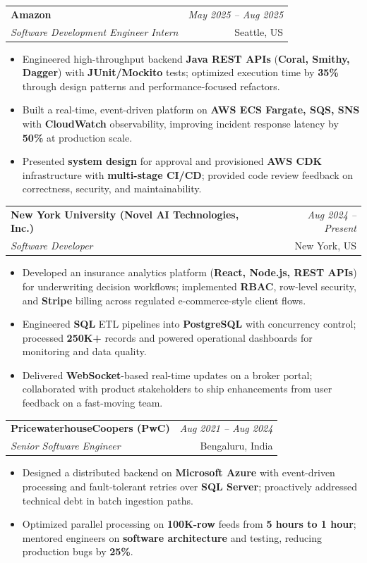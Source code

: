 \documentclass[a4paper,10pt]{article}
\makeatletter
\newcommand{\resumeSubheading}[4]{
\vspace{0.3mm}\item
    \begin{tabular*}{0.98\textwidth}[t]{l@{\extracolsep{\fill}}r}
        \textbf{#1} & \textit{\footnotesize{#4}} \\
        \textit{\footnotesize{#3}} & \footnotesize{#2}\\
    \end{tabular*}\vspace{-2mm}
}
\newcommand{\resumeItemListStart}{\begin{itemize}[leftmargin=*, labelsep=1mm, itemsep=0pt]}
\newcommand{\resumeItemListEnd}{\end{itemize}\vspace{-2mm}}
\makeatother
\begin{document}
\resumeSubheading
{Amazon}{Seattle, US}
{Software Development Engineer Intern}{May 2025 -- Aug 2025}
\resumeItemListStart
\item \footnotesize{Engineered high-throughput backend \textbf{Java REST APIs} (\textbf{Coral, Smithy, Dagger}) with \textbf{JUnit/Mockito} tests; optimized execution time by \textbf{35\%} through design patterns and performance-focused refactors.}
\item \footnotesize{Built a real-time, event-driven platform on \textbf{AWS ECS Fargate, SQS, SNS} with \textbf{CloudWatch} observability, improving incident response latency by \textbf{50\%} at production scale.}
\item \footnotesize{Presented \textbf{system design} for approval and provisioned \textbf{AWS CDK} infrastructure with \textbf{multi-stage CI/CD}; provided code review feedback on correctness, security, and maintainability.}
\resumeItemListEnd

\resumeSubheading
{New York University (Novel AI Technologies, Inc.)}{New York, US}
{Software Developer}{Aug 2024 -- Present}
\resumeItemListStart
\item \footnotesize{Developed an insurance analytics platform (\textbf{React, Node.js, REST APIs}) for underwriting decision workflows; implemented \textbf{RBAC}, row-level security, and \textbf{Stripe} billing across regulated e-commerce-style client flows.}
\item \footnotesize{Engineered \textbf{SQL} ETL pipelines into \textbf{PostgreSQL} with concurrency control; processed \textbf{250K+} records and powered operational dashboards for monitoring and data quality.}
\item \footnotesize{Delivered \textbf{WebSocket}-based real-time updates on a broker portal; collaborated with product stakeholders to ship enhancements from user feedback on a fast-moving team.}
\resumeItemListEnd

\resumeSubheading
{PricewaterhouseCoopers (PwC)}{Bengaluru, India}
{Senior Software Engineer}{Aug 2021 -- Aug 2024}
\resumeItemListStart
\item \footnotesize{Designed a distributed backend on \textbf{Microsoft Azure} with event-driven processing and fault-tolerant retries over \textbf{SQL Server}; proactively addressed technical debt in batch ingestion paths.}
\item \footnotesize{Optimized parallel processing on \textbf{100K-row} feeds from \textbf{5 hours to 1 hour}; mentored engineers on \textbf{software architecture} and testing, reducing production bugs by \textbf{25\%}.}
\resumeItemListEnd
\end{document}
